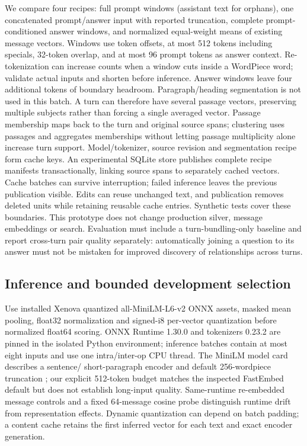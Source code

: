 \documentclass[11pt]{article}
\begin{document}
We compare four recipes: full prompt windows (assistant text for orphans),
one concatenated prompt/answer input with reported truncation, complete
prompt-conditioned answer windows, and normalized equal-weight means of existing
message vectors. Windows use token offsets, at most 512 tokens including specials,
32-token overlap, and at most 96 prompt tokens as answer context. Re-tokenization
can increase counts when a window cuts inside a WordPiece word; validate actual
inputs and shorten before inference. Answer windows leave four additional tokens
of boundary headroom. Paragraph/heading segmentation is not used in this batch.
A turn can therefore have several passage vectors, preserving multiple
subjects rather than forcing a single averaged vector. Passage membership maps
back to the turn and original source spans; clustering uses passages and
aggregates memberships without letting passage multiplicity alone increase
turn support. Model/tokenizer, source revision and segmentation recipe
form cache keys. An experimental SQLite store publishes complete recipe manifests
transactionally, linking source spans to separately cached vectors. Cache batches
can survive interruption; failed inference leaves the previous publication visible.
Edits can reuse unchanged text, and publication removes deleted units while
retaining reusable cache entries. Synthetic tests cover these boundaries. This
prototype does not change production silver, message embeddings or search.
Evaluation must include a turn-bundling-only baseline and report cross-turn
pair quality separately: automatically joining a question to its answer must not
be mistaken for improved discovery of relationships across turns.

\subsection{Inference and bounded development selection}
Use installed Xenova quantized all-MiniLM-L6-v2 ONNX assets, masked mean pooling,
float32 normalization and signed-i8 per-vector quantization before normalized
float64 scoring. ONNX Runtime 1.30.0 and tokenizers 0.23.2 are pinned in the
isolated Python environment; inference batches contain at most eight inputs and
use one intra/inter-op CPU thread. The MiniLM model card describes a sentence/
short-paragraph encoder and default 256-wordpiece truncation \cite{minilm}; our
explicit 512-token budget matches the inspected FastEmbed default but does not
establish long-input quality. Same-runtime re-embedded message controls and a
fixed 64-message cosine probe distinguish runtime drift from representation effects.
Dynamic quantization can depend on batch padding; a content cache retains the
first inferred vector for each text and exact encoder generation.
\end{document}
